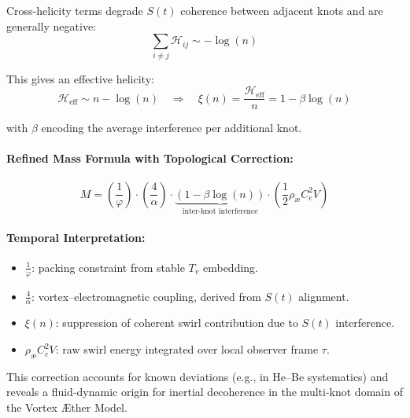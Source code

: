 Cross-helicity terms degrade $S(t)$ coherence between adjacent knots and are generally negative:
\[
\sum_{i \neq j} \mathcal{H}_{ij} \sim -\log(n)
\]

This gives an effective helicity:
\[
\mathcal{H}_{\text{eff}} \sim n - \log(n)
\quad \Rightarrow \quad
\xi(n) = \frac{\mathcal{H}_{\text{eff}}}{n} = 1 - \beta \log(n)
\]

with $\beta$ encoding the average interference per additional knot.

\paragraph{Refined Mass Formula with Topological Correction:}
\begin{equation}
\boxed{
M = \left( \frac{1}{\varphi} \right) \cdot \left( \frac{4}{\alpha} \right) \cdot \underbrace{\left(1 - \beta \log(n)\right)}_{\text{inter-knot interference}} \cdot \left( \frac{1}{2} \rho_\text{\ae} C_e^2 V \right)
}
\end{equation}

\paragraph{Temporal Interpretation:}
\begin{itemize}
  \item $\frac{1}{\varphi}$: packing constraint from stable $T_v$ embedding.
  \item $\frac{4}{\alpha}$: vortex–electromagnetic coupling, derived from $S(t)$ alignment.
  \item $\xi(n)$: suppression of coherent swirl contribution due to $S(t)$ interference.
  \item $\rho_\text{\ae} C_e^2 V$: raw swirl energy integrated over local observer frame $\tau$.
\end{itemize}

This correction accounts for known deviations (e.g., in He–Be systematics) and reveals a fluid-dynamic origin for inertial decoherence in the multi-knot domain of the Vortex \AE{}ther Model.
